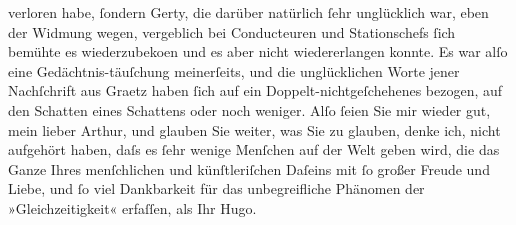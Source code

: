 \begin{ledgroupsized}[t]{13cm}
               verloren habe,{ }{\pb}ſondern Gerty, die darüber natürlich ſehr unglücklich war, eben der
               Widmung wegen, vergeblich bei Conducteuren und Stationschefs ſich bemühte es
                  wiederzubeko{\geminationm}en und es aber nicht wiedererlangen
               konnte.\pend
           \pstart
           Es war alſo eine Gedächtnis-täuſchung {\pb}meinerſeits, und die unglücklichen
               Worte jener Nachſchrift aus Graetz haben ſich auf
               ein Doppelt-nichtgeſchehenes bezogen, auf den Schatten eines Schattens oder noch
               weniger.\pend
           \pstart
           Alſo ſeien Sie mir wieder gut, mein lieber Arthur, und glauben Sie weiter, was Sie
                  {\pb}zu glauben, denke ich, nicht
               aufgehört haben, daſs es ſehr wenige Menſchen auf der Welt geben wird, die das Ganze
               Ihres menſchlichen und künſtleriſchen Daſeins mit ſo großer Freude und Liebe, und ſo
               viel Dankbarkeit für das unbegreifliche Phänomen der »Gleichzeitigkeit« erfaſſen, als
               Ihr\pend
           \pstart \spacefill\mbox{Hugo.}\pend{}
         
         \endnumbering{}\end{ledgroupsized}  \newcommand{\dateiname}{L01978}\newcommand{\titel}{Hugo von Hofmannsthal an Arthur Schnitzler, 7. 11. 1910}\newcommand{\editorInnen}{Martin Anton Müller und Gerd-Hermann Susen}
      